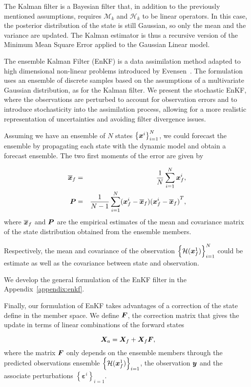 The Kalman filter \cite{kalman_new_1960} is a Bayesian filter that, in addition to the previously mentioned assumptions, requires $\mathcal{M}_k$ and $\mathcal{H}_k$ to be linear operators. In this case, the posterior distribution of the state is still Gaussian, so only the mean and the variance are updated. The Kalman estimator is thus a recursive version of the Minimum Mean Square Error applied to the Gaussian Linear model.

The ensemble Kalman Filter (EnKF) is a data assimilation method adapted to high dimensional non-linear problems introduced by Evensen~\cite{evensen_sequential_1994}. The formulation uses an ensemble of discrete samples based on the assumptions of a multivariate Gaussian distribution, as for the Kalman filter. We present the stochastic EnKF, where the observations are perturbed to account for observation errors and to introduce stochasticity into the assimilation process, allowing for a more realistic representation of uncertainties and avoiding filter divergence issues.

Assuming we have an ensemble of $N$ states $\left\{\bm {\bm{x}}^i \right\}_{i=1}^N$, we could forecast the ensemble by propagating each state with the dynamic model and obtain a forecast ensemble.
The two first moments of the error are given by

\begin{eqnarray*}
    \overline{\bm{x}}_f &=& \frac{1}{N} \sum_{i = 1}^{N} \bm{x}^i_f, \\
    \bm{P} &=& \frac{1}{N-1} \sum_{i = 1}^{N} (\bm{x}^i_f - \overline{\bm{x}}_f){(\bm{x}^i_f - \overline{\bm{x}}_f)}^T,
\end{eqnarray*}
where $\overline{\bm{x}}_f$ and $\bm{P}$ are the empirical estimates of the mean and covariance matrix of the state distribution obtained from the ensemble members.

Respectively, the mean and covariance of the observation $\left\{\mathcal{H}(\bm{x}^1_f) \right\}_{i=1}^N$ could be estimate as well as the covariance between state and observation.

We develop the general formulation of the EnKF filter in the Appendix~\ref{appendix:enkf}.

Finally, our formulation of EnKF takes advantages of a correction of the state define in the member space. We define $\bm{F}$, the correction matrix that gives the update in terms of linear combinations of the forward states

\begin{equation}~\label{enkf_formula_Fcorr}
    \bm{X}_a = \bm{X}_f + \bm{X}_f \bm{F},
\end{equation}where the matrix $\bm{F}$ only depends on the ensemble members through the predicted observations ensemble $\left\{\mathcal{H}(\bm{x}^1_f) \right\}_{i=1}$, the observation $\bm{y}$ and the associate perturbations  $\left\{\bm{\varepsilon}^i \right\}_{i=1}$.